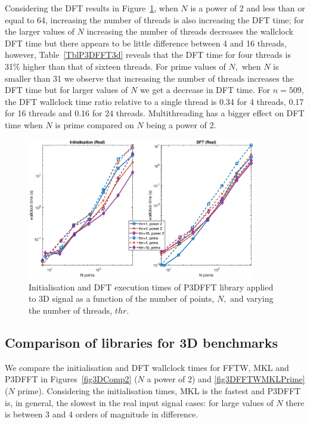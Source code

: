\documentclass[a4paper]{article}
\begin{document}
Considering the DFT results in Figure~\ref{3DP3DFFT}, when $N$ is a
power of 2 and less than or equal to 64, increasing the number of
threads is also increasing the DFT time; for the larger values of $N$
increasing the number of threads decreases the wallclock DFT time but
there appears to be little difference between 4 and 16 threads,
however, Table~\ref{TblP3DFFT3d} reveals that the DFT time for four
threads is 31\% higher than that of sixteen threads. For prime values
of $N,$ when $N$ is smaller than 31 we observe that increasing the
number of threads increases the DFT time but for larger values of $N$
we get a decrease in DFT time. For $n=509,$ the DFT wallclock time
ratio relative to a single thread is 0.34 for 4 threads, 0.17 for 16
threads and 0.16 for 24 threads. Multithreading has a bigger effect on
DFT time when $N$ is prime compared on $N$ being a power of 2.



\begin{figure}[htb]
    \centering
    \includegraphics[width=10cm]{../results/p3dfft_3d_thr.eps}
  \caption{Initialisation and DFT execution times of P3DFFT library applied to 3D signal as a function of the
    number of points, $N,$ and varying the number of threads, $thr.$ }
  \label{3DP3DFFT}
\end{figure}







\subsection{Comparison of libraries for 3D benchmarks}\label{Sec:3DComp}

We compare the initialisation and DFT wallclock times for FFTW, MKL
and P3DFFT in Figures~\ref{fig3DComp2} ($N$ a power of 2) and
\ref{fig3DFFTWMKLPrime} ($N$ prime). Considering the initialisation
times, MKL is the fastest and P3DFFT is, in general, the slowest in
the real input signal cases: for large values of $N$ there is between
3 and 4 orders of magnitude in difference.
\end{document}
